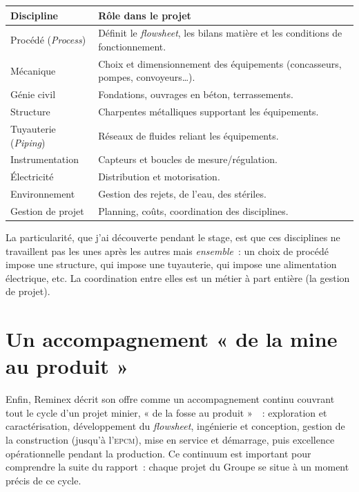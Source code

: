 \documentclass[12pt,a4paper,oneside]{report}
\newcommand{\sig}[1]{\textsc{#1}}
\begin{document}
\begin{center}
\renewcommand{\arraystretch}{1.25}
\begin{tabular}{@{}p{3.4cm} p{10.5cm}@{}}
\toprule
\textbf{Discipline} & \textbf{Rôle dans le projet} \\
\midrule
Procédé (\textit{Process}) & Définit le \textit{flowsheet}, les bilans matière et les conditions de fonctionnement. \\
Mécanique & Choix et dimensionnement des équipements (concasseurs, pompes, convoyeurs\ldots). \\
Génie civil & Fondations, ouvrages en béton, terrassements. \\
Structure & Charpentes métalliques supportant les équipements. \\
Tuyauterie (\textit{Piping}) & Réseaux de fluides reliant les équipements. \\
Instrumentation & Capteurs et boucles de mesure/régulation. \\
Électricité & Distribution et motorisation. \\
Environnement & Gestion des rejets, de l'eau, des stériles. \\
Gestion de projet & Planning, coûts, coordination des disciplines. \\
\bottomrule
\end{tabular}
\label{tab:disciplines}
\end{center}

La particularité, que j'ai découverte pendant le stage, est que ces disciplines ne travaillent pas les unes après les autres mais \emph{ensemble}~: un choix de procédé impose une structure, qui impose une tuyauterie, qui impose une alimentation électrique, etc. La coordination entre elles est un métier à part entière (la gestion de projet).

\section{Un accompagnement « de la mine au produit »}

Enfin, Reminex décrit son offre comme un accompagnement continu couvrant tout le cycle d'un projet minier, « de la fosse au produit »~\cite{reminex_capabilities}~: exploration et caractérisation, développement du \textit{flowsheet}, ingénierie et conception, gestion de la construction (jusqu'à l'\sig{epcm}), mise en service et démarrage, puis excellence opérationnelle pendant la production. Ce continuum est important pour comprendre la suite du rapport~: chaque projet du Groupe se situe à un moment précis de ce cycle.
\end{document}
